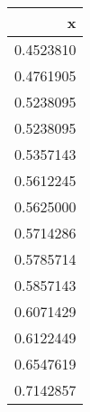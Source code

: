 
\begin{tabular}[t]{r}
\hline
x\\
\hline
0.4523810\\
\hline
0.4761905\\
\hline
0.5238095\\
\hline
0.5238095\\
\hline
0.5357143\\
\hline
0.5612245\\
\hline
0.5625000\\
\hline
0.5714286\\
\hline
0.5785714\\
\hline
0.5857143\\
\hline
0.6071429\\
\hline
0.6122449\\
\hline
0.6547619\\
\hline
0.7142857\\
\hline
\end{tabular}
